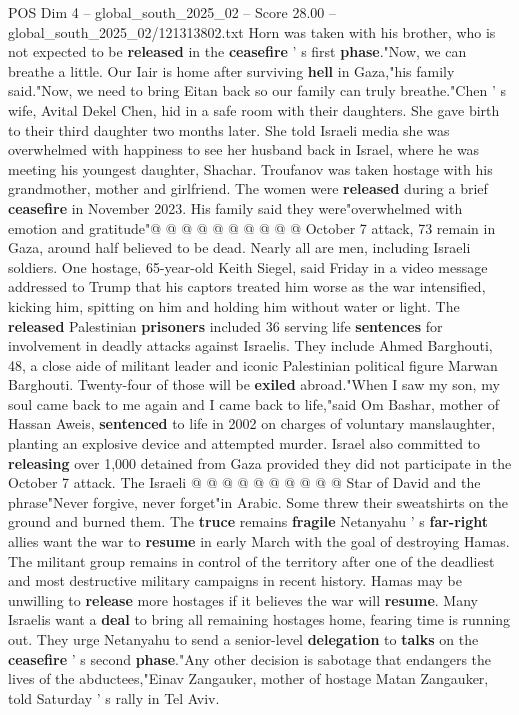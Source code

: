 \begin{textsample}{POS Dim 4 – global\_south\_2025\_02 – Score 28.00 – global\_south\_2025\_02/121313802.txt}
Horn was taken with his brother, who is not expected to be \textbf{released} in the \textbf{ceasefire} ' s first \textbf{phase}."Now, we can breathe a little.
Our Iair is home after surviving \textbf{hell} in Gaza,"his family said."Now, we need to bring Eitan back so our family can truly breathe."Chen ' s wife, Avital Dekel Chen, hid in a safe room with their daughters.
She gave birth to their third daughter two months later.
She told Israeli media she was overwhelmed with happiness to see her husband back in Israel, where he was meeting his youngest daughter, Shachar.
Troufanov was taken hostage with his grandmother, mother and girlfriend.
The women were \textbf{released} during a brief \textbf{ceasefire} in November 2023.
His family said they were"overwhelmed with emotion and gratitude"@ @ @ @ @ @ @ @ @ @ October 7 attack, 73 remain in Gaza, around half believed to be dead.
Nearly all are men, including Israeli soldiers.
One hostage, 65-year-old Keith Siegel, said Friday in a video message addressed to Trump that his captors treated him worse as the war intensified, kicking him, spitting on him and holding him without water or light.
The \textbf{released} Palestinian \textbf{prisoners} included 36 serving life \textbf{sentences} for involvement in deadly attacks against Israelis.
They include Ahmed Barghouti, 48, a close aide of militant leader and iconic Palestinian political figure Marwan Barghouti.
Twenty-four of those will be \textbf{exiled} abroad."When I saw my son, my soul came back to me again and I came back to life,"said Om Bashar, mother of Hassan Aweis, \textbf{sentenced} to life in 2002 on charges of voluntary manslaughter, planting an explosive device and attempted murder.
Israel also committed to \textbf{releasing} over 1,000 detained from Gaza provided they did not participate in the October 7 attack.
The Israeli @ @ @ @ @ @ @ @ @ @ Star of David and the phrase"Never forgive, never forget"in Arabic.
Some threw their sweatshirts on the ground and burned them.
The \textbf{truce} remains \textbf{fragile} Netanyahu ' s \textbf{far-right} allies want the war to \textbf{resume} in early March with the goal of destroying Hamas.
The militant group remains in control of the territory after one of the deadliest and most destructive military campaigns in recent history.
Hamas may be unwilling to \textbf{release} more hostages if it believes the war will \textbf{resume}.
Many Israelis want a \textbf{deal} to bring all remaining hostages home, fearing time is running out.
They urge Netanyahu to send a senior-level \textbf{delegation} to \textbf{talks} on the \textbf{ceasefire} ' s second \textbf{phase}."Any other decision is sabotage that endangers the lives of the abductees,"Einav Zangauker, mother of hostage Matan Zangauker, told Saturday ' s rally in Tel Aviv.

\end{textsample}
